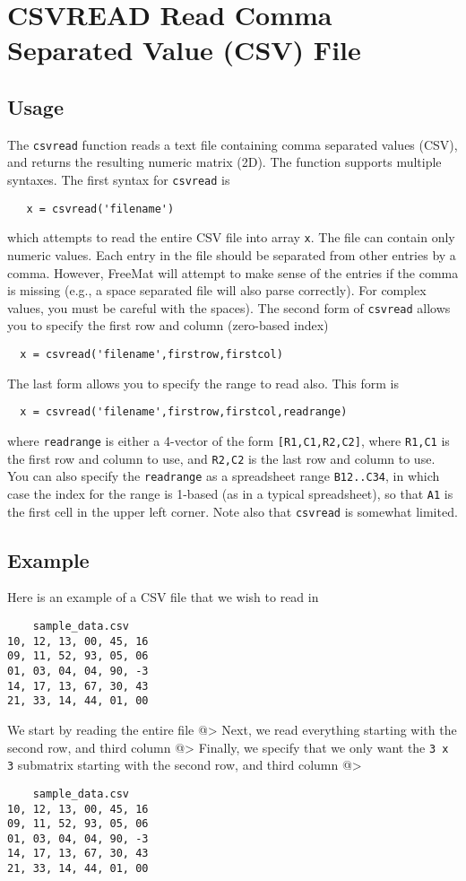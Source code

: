 \section{CSVREAD Read Comma Separated Value (CSV) File}

\subsection{Usage}

The \verb|csvread| function reads a text file containing comma
separated values (CSV), and returns the resulting numeric
matrix (2D).  The function supports multiple syntaxes.  The
first syntax for \verb|csvread| is 
\begin{verbatim}
   x = csvread('filename')
\end{verbatim}
which attempts to read the entire CSV file into array \verb|x|.
The file can contain only numeric values.  Each entry in the
file should be separated from other entries by a comma.  However,
FreeMat will attempt to make sense of the entries if the comma
is missing (e.g., a space separated file will also parse correctly).
For complex values, you must be careful with the spaces).  The second
form of \verb|csvread| allows you to specify the first row and column 
(zero-based index)
\begin{verbatim}
  x = csvread('filename',firstrow,firstcol)
\end{verbatim}
The last form allows you to specify the range to read also.  This form
is
\begin{verbatim}
  x = csvread('filename',firstrow,firstcol,readrange)
\end{verbatim}
where \verb|readrange| is either a 4-vector of the form \verb|[R1,C1,R2,C2]|,
where \verb|R1,C1| is the first row and column to use, and \verb|R2,C2| is the
last row and column to use.  You can also specify the \verb|readrange| as
a spreadsheet range \verb|B12..C34|, in which case the index for the
range is 1-based (as in a typical spreadsheet), so that \verb|A1| is the
first cell in the upper left corner. Note also that \verb|csvread| is
somewhat limited. 
\subsection{Example}

Here is an example of a CSV file that we wish to read in
\begin{verbatim}
    sample_data.csv
10, 12, 13, 00, 45, 16
09, 11, 52, 93, 05, 06
01, 03, 04, 04, 90, -3
14, 17, 13, 67, 30, 43
21, 33, 14, 44, 01, 00
\end{verbatim}
We start by reading the entire file
@>
Next, we read everything starting with the second row, and third column
@>
Finally, we specify that we only want the \verb|3 x 3| submatrix starting
with the second row, and third column
@>
\begin{verbatim}
    sample_data.csv
10, 12, 13, 00, 45, 16
09, 11, 52, 93, 05, 06
01, 03, 04, 04, 90, -3
14, 17, 13, 67, 30, 43
21, 33, 14, 44, 01, 00
\end{verbatim}
